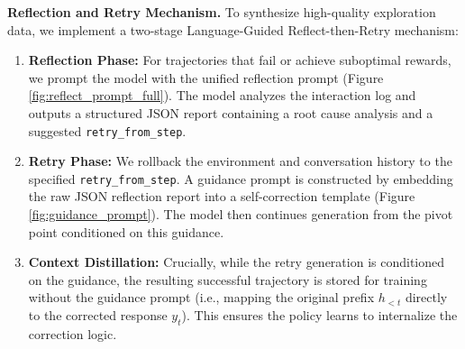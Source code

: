 \textbf{Reflection and Retry Mechanism.}
To synthesize high-quality exploration data, we implement a two-stage Language-Guided Reflect-then-Retry mechanism:
\begin{enumerate}
    \item \textbf{Reflection Phase:} For trajectories that fail or achieve suboptimal rewards, we prompt the model with the unified reflection prompt (Figure \ref{fig:reflect_prompt_full}). The model analyzes the interaction log and outputs a structured JSON report containing a root cause analysis and a suggested \texttt{retry\_from\_step}.
    \item \textbf{Retry Phase:} We rollback the environment and conversation history to the specified \texttt{retry\_from\_step}. A guidance prompt is constructed by embedding the raw JSON reflection report into a self-correction template (Figure \ref{fig:guidance_prompt}). The model then continues generation from the pivot point conditioned on this guidance.
    \item \textbf{Context Distillation:} Crucially, while the retry generation is conditioned on the guidance, the resulting successful trajectory is stored for training without the guidance prompt (i.e., mapping the original prefix $h_{<t}$ directly to the corrected response $y_t$). This ensures the policy learns to internalize the correction logic.
\end{enumerate}

